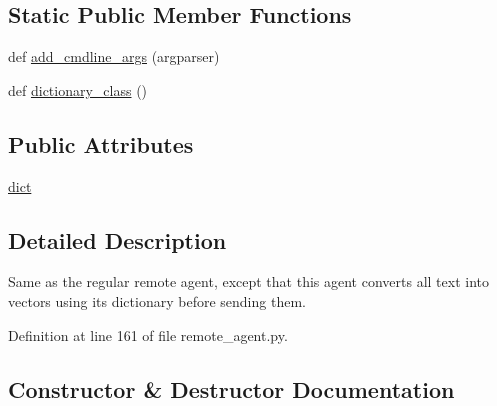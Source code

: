 \subsection*{Static Public Member Functions}
\begin{DoxyCompactItemize}
\item 
def \hyperlink{classparlai_1_1agents_1_1remote__agent_1_1remote__agent_1_1ParsedRemoteAgent_ae364a1860ec6ff9f32dabc42b96004d0}{add\+\_\+cmdline\+\_\+args} (argparser)
\item 
def \hyperlink{classparlai_1_1agents_1_1remote__agent_1_1remote__agent_1_1ParsedRemoteAgent_a5759817c6b1d248a0b64861222745f62}{dictionary\+\_\+class} ()
\end{DoxyCompactItemize}
\subsection*{Public Attributes}
\begin{DoxyCompactItemize}
\item 
\hyperlink{classparlai_1_1agents_1_1remote__agent_1_1remote__agent_1_1ParsedRemoteAgent_ac38a24353bb2fd988c9330c5c9e1434f}{dict}
\end{DoxyCompactItemize}


\subsection{Detailed Description}
\begin{DoxyVerb}Same as the regular remote agent, except that this agent converts all text into
vectors using its dictionary before sending them.
\end{DoxyVerb}
 

Definition at line 161 of file remote\+\_\+agent.\+py.



\subsection{Constructor \& Destructor Documentation}
\mbox{\label{classparlai_1_1agents_1_1remote__agent_1_1remote__agent_1_1ParsedRemoteAgent_a0bb2c02bb6c928455c2ee24117797e19}} 
